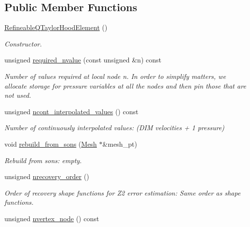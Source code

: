\subsection*{Public Member Functions}
\begin{DoxyCompactItemize}
\item 
\hyperlink{classoomph_1_1RefineableQTaylorHoodElement_a27b2f11524ac177ef5b7643e6f61a4d7}{Refineable\+Q\+Taylor\+Hood\+Element} ()
\begin{DoxyCompactList}\small\item\em Constructor. \end{DoxyCompactList}\item 
unsigned \hyperlink{classoomph_1_1RefineableQTaylorHoodElement_a4b6f46aea58a70a24f9c356074a0ad95}{required\+\_\+nvalue} (const unsigned \&n) const
\begin{DoxyCompactList}\small\item\em Number of values required at local node n. In order to simplify matters, we allocate storage for pressure variables at all the nodes and then pin those that are not used. \end{DoxyCompactList}\item 
unsigned \hyperlink{classoomph_1_1RefineableQTaylorHoodElement_ab47675822b8632474fc4e3e435fc19bf}{ncont\+\_\+interpolated\+\_\+values} () const
\begin{DoxyCompactList}\small\item\em Number of continuously interpolated values\+: (D\+IM velocities + 1 pressure) \end{DoxyCompactList}\item 
void \hyperlink{classoomph_1_1RefineableQTaylorHoodElement_a207d8ad472735c629b01be6318aed44d}{rebuild\+\_\+from\+\_\+sons} (\hyperlink{classoomph_1_1Mesh}{Mesh} $\ast$\&mesh\+\_\+pt)
\begin{DoxyCompactList}\small\item\em Rebuild from sons\+: empty. \end{DoxyCompactList}\item 
unsigned \hyperlink{classoomph_1_1RefineableQTaylorHoodElement_a44ffd481fbc9e2538500a150d7ced7aa}{nrecovery\+\_\+order} ()
\begin{DoxyCompactList}\small\item\em Order of recovery shape functions for Z2 error estimation\+: Same order as shape functions. \end{DoxyCompactList}\item 
unsigned \hyperlink{classoomph_1_1RefineableQTaylorHoodElement_a216582f193bf05ba8baf3ef3683da788}{nvertex\+\_\+node} () const

\end{DoxyCompactItemize}
